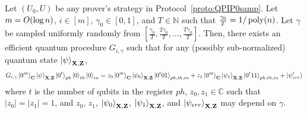 \begin{lemma}\label{lem:partition}
Let $(U_0,U)$ be any prover's strategy in Protocol~\ref{proto:QPIP0samp}. Let $m=O(\log n)$, $i\in[m]$, 
$\gamma_0 \in[0,1]$, and $T\in \mathbb{N}$ such that $\frac{\gamma_0}{T}=1/\operatorname*{\operatorname{poly}}(n)$. Let $\gamma$ be sampled uniformly randomly from $[\frac{\gamma_0}{T},\frac{2\gamma_0}{T},\dots,\frac{T\gamma_0}{T}]$. Then, there exists an efficient quantum procedure $G_{i,\gamma}$ such that for any (possibly sub-normalized) quantum state $\ket{\psi}_{\mathbf{X},\mathbf{Z}}$,  
\begin{align*}
    G_{i,\gamma} \ket{0^m}_{\mathbf{C}}\ket{\psi}_{\mathbf{X},\mathbf{Z}}\ket{0^t}_{ph}\ket{0}_{th}\ket{0}_{in} = z_0\ket{0^m}_{\mathbf{C}}\ket{\psi_{0}}_{\mathbf{X},\mathbf{Z}}\ket{0^t01}_{ph,th,in}+ z_1\ket{0^m}_{\mathbf{C}}\ket{\psi_{1}}_{\mathbf{X},\mathbf{Z}}\ket{0^t11}_{ph,th,in} + \ket{\psi'_{err}}
\end{align*}
where $t$ is the number of qubits in the register $ph$, $z_0,z_1\in \mathbb{C}$ such that $|z_0|=|z_1|=1$, and 
$z_0$, $z_1$, $\ket{\psi_0}_{\mathbf{X},\mathbf{Z}}$, $\ket{\psi_1}_{\mathbf{X},\mathbf{Z}}$, and $\ket{\psi_{err}}_{\mathbf{X},\mathbf{Z}}$ may depend on $\gamma$.


\end{lemma}
